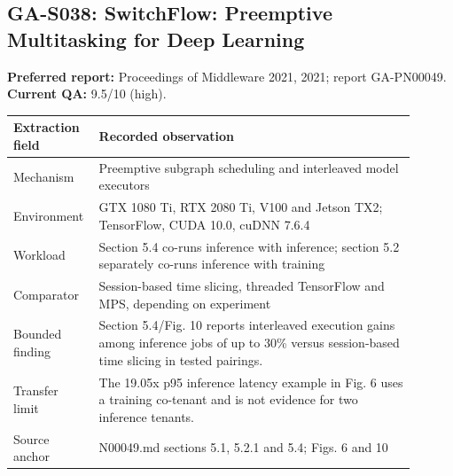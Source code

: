 \subsection{GA-S038: SwitchFlow: Preemptive Multitasking for Deep Learning}
\textbf{Preferred report:} Proceedings of Middleware 2021, 2021; report GA-PN00049. \textbf{Current QA:} 9.5/10 (high).
\begin{longtable}{P{0.15\linewidth}P{0.75\linewidth}}
\toprule Extraction field & Recorded observation\\\midrule\endhead
Mechanism & Preemptive subgraph scheduling and interleaved model executors\\
Environment & GTX 1080 Ti, RTX 2080 Ti, V100 and Jetson TX2; TensorFlow, CUDA 10.0, cuDNN 7.6.4\\
Workload & Section 5.4 co-runs inference with inference; section 5.2 separately co-runs inference with training\\
Comparator & Session-based time slicing, threaded TensorFlow and MPS, depending on experiment\\
Bounded finding & Section 5.4/Fig. 10 reports interleaved execution gains among inference jobs of up to 30\% versus session-based time slicing in tested pairings.\\
Transfer limit & The 19.05x p95 inference latency example in Fig. 6 uses a training co-tenant and is not evidence for two inference tenants.\\
Source anchor & N00049.md sections 5.1, 5.2.1 and 5.4; Figs. 6 and 10\\
\bottomrule\end{longtable}
